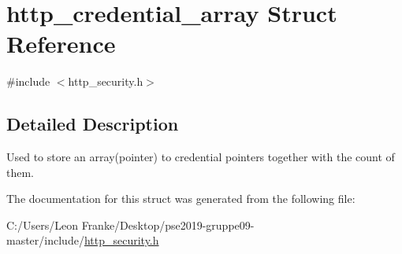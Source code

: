 \hypertarget{structhttp__credential__array}{}\section{http\+\_\+credential\+\_\+array Struct Reference}
\label{structhttp__credential__array}


{\ttfamily \#include $<$http\+\_\+security.\+h$>$}



\subsection{Detailed Description}
Used to store an array(pointer) to credential pointers together with the count of them. 

The documentation for this struct was generated from the following file\+:\begin{DoxyCompactItemize}
\item 
C\+:/\+Users/\+Leon Franke/\+Desktop/pse2019-\/gruppe09-\/master/include/\mbox{\hyperlink{http__security_8h}{http\+\_\+security.\+h}}\end{DoxyCompactItemize}
